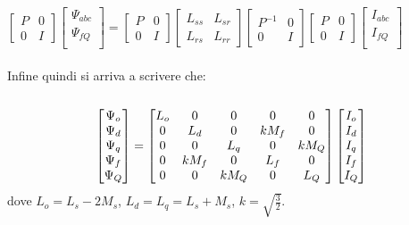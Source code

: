 \documentclass[Lau,noexaminfo]{sapthesis}
\begin{document}
	$\begin{bmatrix}
	P & 0\\
	0 & I
	\end{bmatrix}\begin{bmatrix}
		\Psi_{abc}\\
		\Psi_{fQ}\\
	\end{bmatrix}=
	\begin{bmatrix}
		P & 0\\
		0 & I
	\end{bmatrix}
	\begin{bmatrix}
	L_{ss} & L_{sr}\\
	L_{rs} & L_{rr}
	\end{bmatrix}
	\begin{bmatrix}
	P^{-1} & 0\\
	0 & I
	\end{bmatrix}
	\begin{bmatrix}
	P & 0\\
	0 & I
	\end{bmatrix}
	\begin{bmatrix}
	I_{abc}\\
	I_{fQ}\\
	\end{bmatrix}$\\\\
	Infine quindi si arriva a scrivere che:\\\\
	\begin{equation}
	\begin{bmatrix}
		\Psi_o\\
		\Psi_d\\
		\Psi_q\\
		\Psi_f\\
		\Psi_Q
	\end{bmatrix}=
	\begin{bmatrix}
	L_o & 0 & 0 & 0 & 0\\
	0 & L_d & 0 & kM_f & 0\\
	0 & 0 & L_q & 0 & kM_Q\\
	0 & kM_f & 0 & L_f & 0\\
	0 & 0 & kM_Q & 0 & L_Q
	\end{bmatrix}
	\begin{bmatrix}
	I_o\\
	I_d\\
	I_q\\
	I_f\\
	I_Q
	\end{bmatrix}\\
	\end{equation}
	dove $L_o=L_s - 2M_s$, $L_d=L_q=L_s+M_s$, $k=\sqrt{\frac{3}{2}}$.
\end{document}
